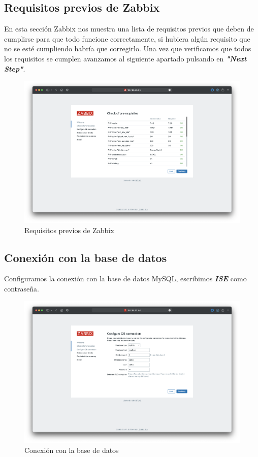     \subsection{Requisitos previos de Zabbix}
    En esta sección Zabbix nos muestra una lista de requisitos previos que deben de cumplirse para que todo funcione correctamente, si hubiera algún requisito que no se esté 
    cumpliendo habría que corregirlo. Una vez que verificamos que todos los requisitos se cumplen avanzamos al siguiente apartado pulsando en \textbf{\emph{"Next Step"}}.
    \begin{figure}[H]
        \centering
        \includegraphics[scale=0.25]{images/zabbix_installation_2.png}
        \caption{Requisitos previos de Zabbix}
        \label{fig:zabbix_installation_2}
    \end{figure}

    \subsection{Conexión con la base de datos}
    Configuramos la conexión con la base de datos MySQL, escribimos \textbf{\emph{ISE}} como contraseña.
    \begin{figure}[H]
        \centering
        \includegraphics[scale=0.25]{images/zabbix_installation_3.png}
        \caption{Conexión con la base de datos}
        \label{fig:zabbix_installation_3}
    \end{figure}

